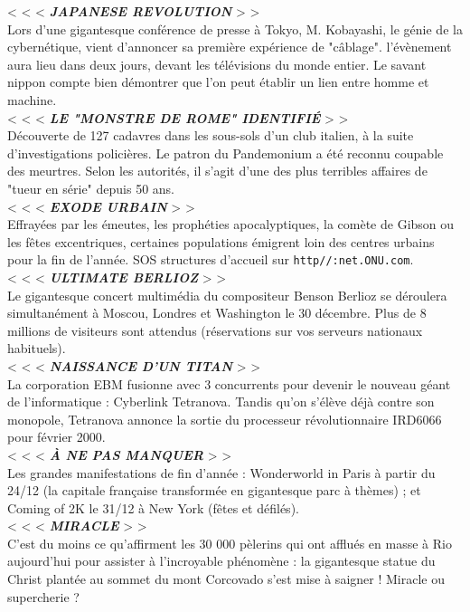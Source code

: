 \documentclass[11pt,twoside,a4paper]{book}
\begin{document}
< < <  \textbf{\textit{JAPANESE REVOLUTION}} > >~\\
Lors d'une gigantesque conf{\'e}rence de presse {\`a} Tokyo, M. Kobayashi, le g{\'e}nie de la cybern{\'e}tique, vient d'annoncer sa premi{\`e}re exp{\'e}rience de "c{\^a}blage". l'{\'e}v{\`e}nement aura lieu dans deux jours, devant les t{\'e}l{\'e}visions du monde entier. Le savant nippon compte bien d{\'e}montrer que l'on peut {\'e}tablir un lien entre homme et machine.~\\
< < <  \textbf{\textit{LE "MONSTRE DE ROME" IDENTIFI{\'E}}} > >~\\
D{\'e}couverte de 127 cadavres dans les sous-sols d'un club italien, {\`a} la suite d'investigations polici{\`e}res. Le patron du Pandemonium a {\'e}t{\'e} reconnu coupable des meurtres. Selon les autorit{\'e}s, il s'agit d'une des plus terribles affaires de "tueur en s{\'e}rie" depuis 50 ans.~\\
< < <  \textbf{\textit{EXODE URBAIN}} > >~\\
Effray{\'e}es par les {\'e}meutes, les proph{\'e}ties apocalyptiques, la com{\`e}te de Gibson ou les f{\^e}tes excentriques, certaines populations {\'e}migrent loin des centres urbains pour la fin de l'ann{\'e}e. SOS structures d'accueil sur \texttt{http//:net.ONU.com}.~\\
< < <  \textbf{\textit{ULTIMATE BERLIOZ}} > >~\\
Le gigantesque concert multim{\'e}dia du compositeur Benson Berlioz se d{\'e}roulera simultan{\'e}ment {\`a} Moscou, Londres et Washington le 30 d{\'e}cembre. Plus de 8 millions de visiteurs sont attendus (r{\'e}servations sur vos serveurs nationaux habituels).~\\
< < <  \textbf{\textit{NAISSANCE D'UN TITAN}} > >~\\
La corporation EBM fusionne avec 3 concurrents pour devenir le nouveau g{\'e}ant de l'informatique : Cyberlink Tetranova. Tandis qu'on s'{\'e}l{\`e}ve d{\'e}j{\`a} contre son monopole, Tetranova annonce la sortie du processeur r{\'e}volutionnaire IRD6066 pour f{\'e}vrier 2000.~\\
< < <  \textbf{\textit{{\`A} NE PAS MANQUER}} > >~\\
Les grandes manifestations de fin d'ann{\'e}e : Wonderworld in Paris {\`a} partir du 24/12 (la capitale fran\c{c}aise transform{\'e}e en gigantesque parc {\`a} th{\`e}mes) ; et Coming of 2K le 31/12 {\`a} New York (f{\^e}tes et d{\'e}fil{\'e}s).~\\
< < <  \textbf{\textit{MIRACLE}} > >~\\
C'est du moins ce qu'affirment les 30 000 p{\`e}lerins qui ont afflu{\'e}s en masse {\`a} Rio aujourd'hui pour assister {\`a} l'incroyable ph{\'e}nom{\`e}ne : la gigantesque statue du Christ plant{\'e}e au sommet du mont Corcovado s'est mise {\`a} saigner ! Miracle ou supercherie ?~\\
\end{document}
